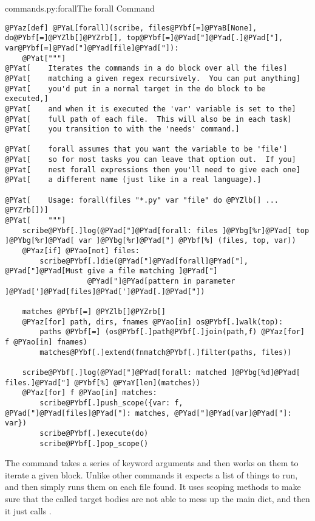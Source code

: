 \begin{code}{commands.py:forall}{The forall Command}
\begin{Verbatim}[commandchars=@\[\]]
@PYaz[def] @PYaL[forall](scribe, files@PYbf[=]@PYaB[None], do@PYbf[=]@PYZlb[]@PYZrb[], top@PYbf[=]@PYad["]@PYad[.]@PYad["], var@PYbf[=]@PYad["]@PYad[file]@PYad["]):
    @PYat["""]
@PYat[    Iterates the commands in a do block over all the files]
@PYat[    matching a given regex recursively.  You can put anything]
@PYat[    you'd put in a normal target in the do block to be executed,]
@PYat[    and when it is executed the 'var' variable is set to the]
@PYat[    full path of each file.  This will also be in each task]
@PYat[    you transition to with the 'needs' command.]

@PYat[    forall assumes that you want the variable to be 'file']
@PYat[    so for most tasks you can leave that option out.  If you]
@PYat[    nest forall expressions then you'll need to give each one]
@PYat[    a different name (just like in a real language).]

@PYat[    Usage: forall(files "*.py" var "file" do @PYZlb[] ... @PYZrb[])]
@PYat[    """]
    scribe@PYbf[.]log(@PYad["]@PYad[forall: files ]@PYbg[%r]@PYad[ top ]@PYbg[%r]@PYad[ var ]@PYbg[%r]@PYad["] @PYbf[%] (files, top, var))
    @PYaz[if] @PYao[not] files:
        scribe@PYbf[.]die(@PYad["]@PYad[forall]@PYad["], @PYad["]@PYad[Must give a file matching ]@PYad["]
                   @PYad["]@PYad[pattern in parameter ]@PYad[']@PYad[files]@PYad[']@PYad[.]@PYad["])

    matches @PYbf[=] @PYZlb[]@PYZrb[]
    @PYaz[for] path, dirs, fnames @PYao[in] os@PYbf[.]walk(top):
        paths @PYbf[=] (os@PYbf[.]path@PYbf[.]join(path,f) @PYaz[for] f @PYao[in] fnames)
        matches@PYbf[.]extend(fnmatch@PYbf[.]filter(paths, files))

    scribe@PYbf[.]log(@PYad["]@PYad[forall: matched ]@PYbg[%d]@PYad[ files.]@PYad["] @PYbf[%] @PYaY[len](matches))
    @PYaz[for] f @PYao[in] matches:
        scribe@PYbf[.]push_scope({var: f, @PYad["]@PYad[files]@PYad["]: matches, @PYad["]@PYad[var]@PYad["]: var})
        scribe@PYbf[.]execute(do)
        scribe@PYbf[.]pop_scope()
\end{Verbatim}

\end{code}

The  command takes a series of keyword arguments and then works on
them to iterate a given block.  Unlike other commands it expects a list of
things to run, and then simply runs them on each file found.  It uses
 scoping methods to make sure that the called target bodies are
not able to mess up the main  dict, and then it just calls
.

